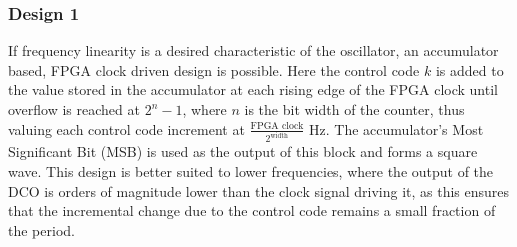 \documentclass[conference]{IEEEtran}
\begin{document}

\subsubsection*{Design 1}
If frequency linearity is a desired characteristic of the oscillator, an accumulator based, FPGA clock driven design is possible. 
Here the control code $k$ is added to the value stored in the accumulator at each rising edge of the FPGA clock until overflow is reached at $2^n-1$, where $n$ is the bit width of the counter, thus valuing each control code increment at $\frac{\textrm{FPGA clock}}{2^{\textrm{width}}}$ Hz. The accumulator's Most Significant Bit (MSB) is used as the output of this block and forms a square wave.
This design is better suited to lower frequencies, where the output of the DCO is orders of magnitude lower than the clock signal driving it, as this ensures that the incremental change due to the control code remains a small fraction of the period.
\end{document}
